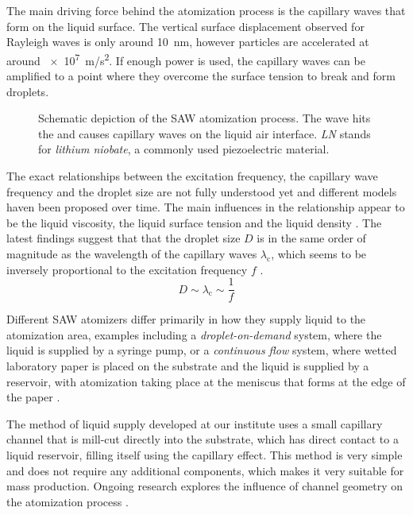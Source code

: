 The main driving force behind the atomization process is the capillary waves that form on the liquid surface.
The vertical surface displacement observed for Rayleigh waves is only around \SI{10}{\nano\meter}, however particles are accelerated at around \SI{e7}{\meter/\second\squared}.
If enough power is used, the capillary waves can be amplified to a point where they overcome the surface tension to break and form droplets.

\begin{figure}[htbp]
    \centering
    \caption{Schematic depiction of the SAW atomization process. The wave hits the and causes capillary waves on the liquid air interface. \emph{LN} stands for \emph{lithium niobate}, a commonly used piezoelectric material. \cite{aishaqiInvestigationSAWAtomization2009}}
    \label{fig:atomization}
\end{figure}

The exact relationships between the excitation frequency, the capillary wave frequency and the droplet size are not fully understood yet and different models haven been proposed over time.
The main influences in the relationship appear to be the liquid viscosity, the liquid surface tension and the liquid density \cite{aishaqiInvestigationSAWAtomization2009,huangExperimentalResearchSurface2022}.
The latest findings suggest that that the droplet size $D$ is in the same order of magnitude as the wavelength of the capillary waves $\lambda_\text{c}$, which seems to be inversely proportional to the excitation frequency $f$ \cite{collinsAtomizationThinWater2012}.
$$
    D \sim \lambda_\text{c} \sim \frac{1}{f}
$$

Different SAW atomizers differ primarily in how they supply liquid to the atomization area, examples including a \emph{droplet-on-demand} system, where the liquid is supplied by a syringe pump, or a \emph{continuous flow} system, where wetted laboratory paper is placed  on the substrate and the liquid is supplied by a reservoir, with atomization taking place at the meniscus that forms at the edge of the paper \cite{winklerSAWbasedFluidAtomization2015a}.

The method of liquid supply developed at our institute uses a small capillary channel that is mill-cut directly into the substrate, which has direct contact to a liquid reservoir, filling itself using the capillary effect.
This method is very simple and does not require any additional components, which makes it very suitable for mass production.
Ongoing research explores the influence of channel geometry on the atomization process \cite{kapplAkustischInduzierteVernebelung2022}.

